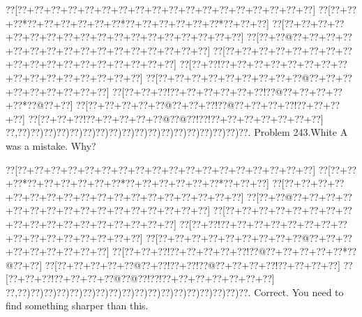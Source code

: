 \documentclass[a5paper]{article}
\begin{document}
\newpage
\begin{center}
{\goo
\0??[\0??+\0??+\0??+\0??+\0??+\0??+\0??+\0??+\0??+\0??+\0??+\0??+\0??+\0??+\0??+\0??+\0??+\0??]
\0??[\0??+\0??+\0??*\0??+\0??+\0??+\0??+\0??+\0??*\0??+\0??+\0??+\0??+\0??+\0??*\0??+\0??+\0??]
\0??[\0??+\0??+\0??+\0??+\0??+\0??+\0??+\0??+\0??+\0??+\0??+\0??+\0??+\0??+\0??+\0??+\0??+\0??]
\0??[\0??+\0??@\0??+\0??+\0??+\0??+\0??+\0??+\0??+\0??+\0??+\0??+\0??+\0??+\0??+\0??+\0??+\0??]
\0??[\0??+\0??+\0??+\0??+\0??+\0??+\0??+\0??+\0??+\0??+\0??+\0??+\0??+\0??+\0??+\0??+\0??+\0??]
\0??[\0??+\0??!\0??+\0??+\0??+\0??+\0??+\0??+\0??+\0??+\0??+\0??+\0??+\0??+\0??+\0??+\0??+\0??]
\0??[\0??+\0??+\0??+\0??+\0??+\0??+\0??+\0??+\0??@\0??+\0??+\0??+\0??+\0??+\0??+\0??+\0??+\0??]
\0??[\0??+\0??+\0??!\0??+\0??+\0??+\0??+\0??+\0??!\0??@\0??+\0??+\0??+\0??+\0??*\0??@\0??+\0??]
\0??[\0??+\0??+\0??+\0??+\0??@\0??+\0??+\0??!\0??@\0??+\0??+\0??+\0??!\0??+\0??+\0??+\0??]
\0??[\0??+\0??+\0??!\0??+\0??+\0??+\0??+\0??@\0??@\0??!\0??!\0??+\0??+\0??+\0??+\0??+\0??+\0??]
\0??,\0??)\0??)\0??)\0??)\0??)\0??)\0??)\0??)\0??)\0??)\0??)\0??)\0??)\0??)\0??)\0??)\0??)\0??.
}
Problem 243.White A was a mistake. Why?

\end{center}
\begin{center}
{\goo
\0??[\0??+\0??+\0??+\0??+\0??+\0??+\0??+\0??+\0??+\0??+\0??+\0??+\0??+\0??+\0??+\0??+\0??+\0??]
\0??[\0??+\0??+\0??*\0??+\0??+\0??+\0??+\0??+\0??*\0??+\0??+\0??+\0??+\0??+\0??*\0??+\0??+\0??]
\0??[\0??+\0??+\0??+\0??+\0??+\0??+\0??+\0??+\0??+\0??+\0??+\0??+\0??+\0??+\0??+\0??+\0??+\0??]
\0??[\0??+\0??@\0??+\0??+\0??+\0??+\0??+\0??+\0??+\0??+\0??+\0??+\0??+\0??+\0??+\0??+\0??+\0??]
\0??[\0??+\0??+\0??+\0??+\0??+\0??+\0??+\0??+\0??+\0??+\0??+\0??+\0??+\0??+\0??+\0??+\0??+\0??]
\0??[\0??+\0??!\0??+\0??+\0??+\0??+\0??+\0??+\0??+\0??+\0??+\0??+\0??+\0??+\0??+\0??+\0??+\0??]
\0??[\0??+\0??+\0??+\0??+\0??+\0??+\0??+\0??+\0??@\0??+\0??+\0??+\0??+\0??+\0??+\0??+\0??+\0??]
\0??[\0??+\0??+\0??!\0??+\0??+\0??+\0??+\0??!\0??@\0??+\0??+\0??+\0??+\0??*\0??@\0??+\0??]
\0??[\0??+\0??+\0??+\0??+\0??@\0??+\0??!\0??+\0??!\0??@\0??+\0??+\0??+\0??!\0??+\0??+\0??+\0??]
\0??[\0??+\0??+\0??!\0??+\0??+\0??+\0??@\0??@\0??!\0??!\0??+\0??+\0??+\0??+\0??+\0??+\0??]
\0??,\0??)\0??)\0??)\0??)\0??)\0??)\0??)\0??)\0??)\0??)\0??)\0??)\0??)\0??)\0??)\0??)\0??)\0??.
}
Correct. You need to find something sharper than this.

\end{center}
\end{document}
